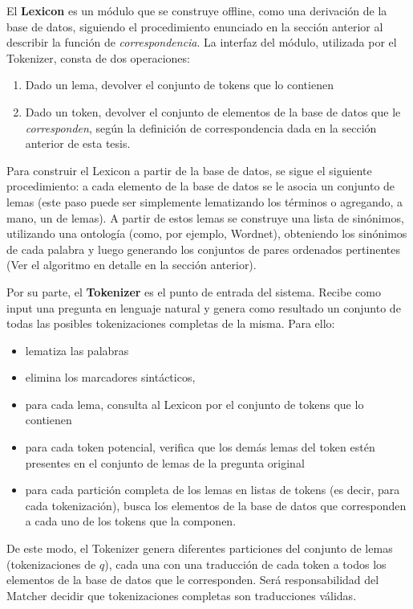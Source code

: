 El \textbf{Lexicon} es un módulo que se construye offline, como una derivación de la base de datos, siguiendo el procedimiento enunciado en la sección anterior al describir la función de \textit{correspondencia}. La interfaz del módulo, utilizada por el Tokenizer, consta de dos operaciones:
\begin{enumerate}
  \item Dado un lema, devolver el conjunto de tokens que lo contienen
  \item Dado un token, devolver el conjunto de elementos de la base de datos que le \textit{corresponden}, según la definición de correspondencia dada en la sección anterior de esta tesis.
\end{enumerate}

Para construir el Lexicon a partir de la base de datos, se sigue el siguiente procedimiento: a cada elemento de la base de datos se le asocia un conjunto de lemas (este paso puede ser simplemente lematizando los términos o agregando, a mano, un  de lemas). A partir de estos lemas se construye una lista de sinónimos, utilizando una ontología (como, por ejemplo, Wordnet), obteniendo los sinónimos de cada palabra y luego generando los conjuntos de pares ordenados pertinentes (Ver el algoritmo en detalle en la sección anterior).

Por su parte, el \textbf{Tokenizer} es el punto de entrada del sistema. Recibe como input una pregunta en lenguaje natural y genera como resultado un conjunto de todas las posibles tokenizaciones completas de la misma. Para ello:
\begin{itemize}
  \item lematiza las palabras
  \item elimina los marcadores sintácticos,
  \item para cada lema, consulta al Lexicon por el conjunto de tokens que lo contienen
  \item para cada token potencial, verifica que los demás lemas del token estén presentes en el conjunto de lemas de la pregunta original
  \item para cada partición completa de los lemas en listas de tokens (es decir, para cada tokenización), busca los elementos de la base de datos que corresponden a cada uno de los tokens que la componen.
\end{itemize}

De este modo, el Tokenizer genera diferentes particiones del conjunto de lemas (tokenizaciones de $q$), cada una con una traducción de cada token a todos los elementos de la base de datos que le corresponden. Será responsabilidad del Matcher decidir que tokenizaciones completas son traducciones válidas.

